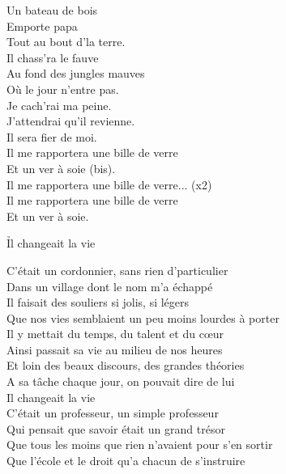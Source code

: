 \documentclass{novel}
\begin{document}
{\begin{minipage}[t][0.4\textheight][t]{\textwidth}
\begin{multicols}{2}
Un bateau de bois \\
Emporte papa \\
Tout au bout d'la terre. \\
Il chass'ra le fauve \\
Au fond des jungles mauves \\
Où le jour n'entre pas. \\
Je cach'rai ma peine. \\
J'attendrai qu'il revienne. \\
Il sera fier de moi. \\
Il me rapportera une bille de verre \\
Et un ver à soie (bis). \\

Il me rapportera une bille de verre... (x2) \\
Il me rapportera une bille de verre \\
Et un ver à soie. \\

\end{multicols}
\end{minipage}
\vspace{0.02\textheight}

\begin{minipage}[b][0.55\textheight][t]{\textwidth}
\h*{Il changeait la vie}
\begin{multicols}{2}
\scriptsize
C'était un cordonnier, sans rien d'particulier \\
Dans un village dont le nom m'a échappé \\
Il faisait des souliers si jolis, si légers \\
Que nos vies semblaient un peu moins lourdes à porter \\

Il y mettait du temps, du talent et du cœur \\
Ainsi passait sa vie au milieu de nos heures \\
Et loin des beaux discours, des grandes théories \\
A sa tâche chaque jour, on pouvait dire de lui \\
Il changeait la vie \\

C'était un professeur, un simple professeur \\
Qui pensait que savoir était un grand trésor \\
Que tous les moins que rien n'avaient pour s'en sortir \\
Que l'école et le droit qu'a chacun de s'instruire \\


\end{multicols}
\end{minipage}}
\end{document}
